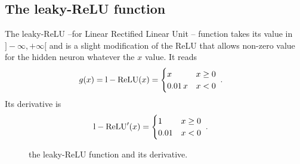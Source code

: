 \subsection{The leaky-ReLU function}


The leaky-ReLU --for Linear Rectified Linear Unit -- function takes its value in $]-\infty,+\infty[$ and is a slight modification of the ReLU that allows non-zero value for the hidden neuron whatever the $x$ value. It reads
\begin{align}
g(x)&={\rm l-ReLU}(x)=\begin{cases}
      x & x\geq 0 \\
      0.01\,x & x<0
   \end{cases}\;.
\end{align}
Its derivative is
\begin{align}
{\rm l-ReLU}'(x)&=\begin{cases}
      1 & x\geq 0 \\
      0.01 & x<0
   \end{cases}\;.
\end{align}

\begin{figure}[H]
\begin{center}
\end{center}
\caption{\label{fig:lrelu} the leaky-ReLU function and its derivative.}
\end{figure}

